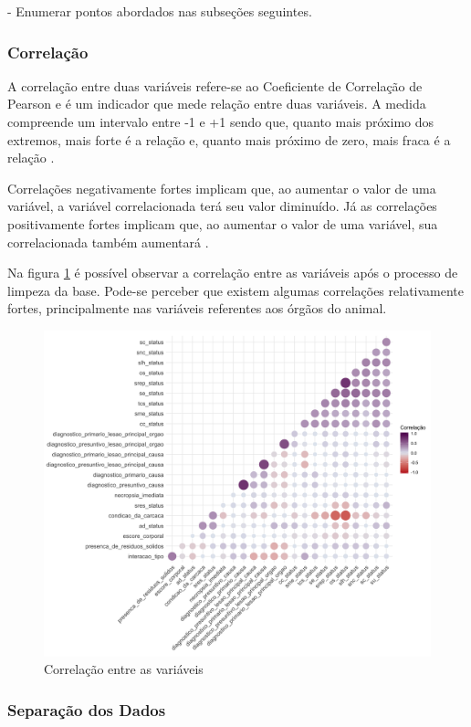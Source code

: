 \documentclass[12pt]{article}
\begin{document}
- Enumerar pontos abordados nas subseções seguintes.

\subsubsection{Correlação}

A correlação entre duas variáveis refere-se ao Coeficiente de Correlação de Pearson e é um indicador que mede relação entre duas variáveis. A medida compreende um intervalo entre -1 e +1 sendo que, quanto mais próximo dos extremos, mais forte é a relação e, quanto mais próximo de zero, mais fraca é a relação \cite{lantz:mlinR}.

Correlações negativamente fortes implicam que, ao aumentar o valor de uma variável, a variável correlacionada terá seu valor diminuído. Já as correlações positivamente fortes implicam que, ao aumentar o valor de uma variável, sua correlacionada também aumentará \cite{lantz:mlinR, aggarwal:dcaa}.

Na figura \ref{fig:correlation} é possível observar a correlação entre as variáveis após o processo de limpeza da base. Pode-se perceber que existem algumas correlações relativamente fortes, principalmente nas variáveis referentes aos órgãos do animal.

\begin{figure}[ht]
\centering
\includegraphics[width=.8\textwidth]{correlacao_dados_sem_na.png}
\caption{Correlação entre as variáveis}
\label{fig:correlation}
\end{figure}

\subsubsection{Separação dos Dados}
\end{document}
